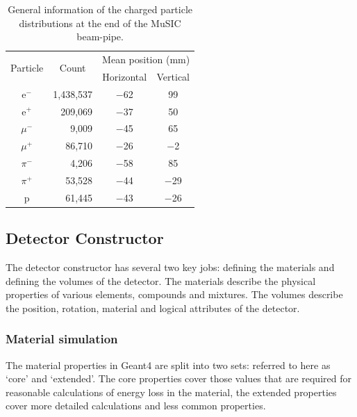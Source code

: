 \begin{table}
  \begin{center}
  \begin{tabular}{c | r | c | c}
    \multicolumn{1}{c|}{\multirow{2}{*}{Particle}} 
               &  \multicolumn{1}{c|}{\multirow{2}{*}{Count}} 
                             &  \multicolumn{2}{c}{Mean position (mm)}    \\
               &             &  Horizontal  &  Vertical \\
    \hline
      e\(^-\)  &  1,438,537  &    \(-\)62   &       99  \\
      e\(^+\)  &    209,069  &    \(-\)37   &       50  \\
    \(\mu^-\)  &      9,009  &    \(-\)45   &       65  \\
    \(\mu^+\)  &     86,710  &    \(-\)26   &   \(-\)2  \\
    \(\pi^-\)  &      4,206  &    \(-\)58   &       85  \\
    \(\pi^+\)  &     53,528  &    \(-\)44   &  \(-\)29  \\
       p       &     61,445  &    \(-\)43   &  \(-\)26  \\
  \end{tabular}
  \end{center}
  \caption{General information of the charged particle distributions at the end of the MuSIC beam-pipe.}
  \label{tab:g4bl_particle_counts}
\end{table}

\subsection{Detector Constructor} %
\label{sec:detector_constructor}
The detector constructor has several two key jobs: defining the materials and defining the volumes of the detector. The materials describe the physical properties of various elements, compounds and mixtures. The volumes describe the position, rotation, material and logical attributes of the detector. 

\subsubsection{Material simulation} %
\label{sub:material_simulation}
The material properties in Geant4 are split into two sets: referred to here as `core' and `extended'. The core properties cover those values that are required for reasonable calculations of energy loss in the material, the extended properties cover more detailed calculations and less common properties. 

